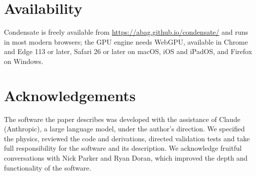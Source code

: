 \documentclass[11pt,a4paper]{article}
\begin{document}
\section*{Availability}

Condensate is freely available from \url{https://abag.github.io/condensate/} and runs in most modern browsers; the GPU engine needs WebGPU, available in Chrome and Edge 113 or later, Safari 26 or later on macOS, iOS and iPadOS, and Firefox on Windows.

\section*{Acknowledgements}

The software the paper describes was developed with the assistance of Claude (Anthropic), a large language model, under the author's direction. We specified the physics, reviewed the code and derivations, directed validation tests and take full responsibility for the software and its description. We acknowledge fruitful conversations with Nick Parker and Ryan Doran, which improved the depth and functionality of the software.
\end{document}
